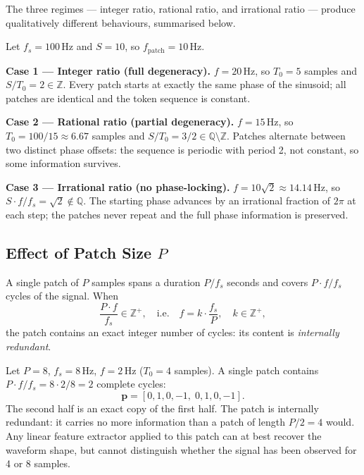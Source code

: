The three regimes — integer ratio, rational ratio, and irrational ratio — produce
qualitatively different behaviours, summarised below.

\begin{example}
	Let $f_s = 100\,\text{Hz}$ and $S = 10$, so $f_{\mathrm{patch}} = 10\,\text{Hz}$.
	
	\smallskip
	\noindent\textbf{Case 1 — Integer ratio (full degeneracy).}
	$f = 20\,\text{Hz}$, so $T_0 = 5$ samples and $S/T_0 = 2 \in \mathbb{Z}$.
	Every patch starts at exactly the same phase of the sinusoid; all patches are
	identical and the token sequence is constant.
	
	\smallskip
	\noindent\textbf{Case 2 — Rational ratio (partial degeneracy).}
	$f = 15\,\text{Hz}$, so $T_0 = 100/15 \approx 6.67$ samples and
	$S/T_0 = 3/2 \in \mathbb{Q} \setminus \mathbb{Z}$.
	Patches alternate between two distinct phase offsets: the sequence is periodic
	with period 2, not constant, so some information survives.
	
	\smallskip
	\noindent\textbf{Case 3 — Irrational ratio (no phase-locking).}
	$f = 10\sqrt{2} \approx 14.14\,\text{Hz}$, so $S \cdot f / f_s = \sqrt{2} \notin
	\mathbb{Q}$.
	The starting phase advances by an irrational fraction of $2\pi$ at each step;
	the patches never repeat and the full phase information is preserved.
\end{example}

\subsection{Effect of Patch Size \texorpdfstring{$P$}{P}}

A single patch of $P$ samples spans a duration $P/f_s$ seconds and covers
$P \cdot f / f_s$ cycles of the signal.
When
\begin{equation}
	\frac{P \cdot f}{f_s} \in \mathbb{Z}^+,
	\quad \text{i.e.} \quad
	f = k \cdot \frac{f_s}{P}, \quad k \in \mathbb{Z}^+,
\end{equation}
the patch contains an exact integer number of cycles: its content is
\emph{internally redundant}.

\begin{example}
	Let $P = 8$, $f_s = 8\,\text{Hz}$, $f = 2\,\text{Hz}$ ($T_0 = 4$ samples).
	A single patch contains $P \cdot f / f_s = 8 \cdot 2 / 8 = 2$ complete cycles:
	\[
	\mathbf{p} = [0, 1, 0, -1,\; 0, 1, 0, -1].
	\]
	The second half is an exact copy of the first half.
	The patch is internally redundant: it carries no more information than a patch of
	length $P/2 = 4$ would.
	Any linear feature extractor applied to this patch can at best recover the waveform
	shape, but cannot distinguish whether the signal has been observed for 4 or 8 samples.
\end{example}

